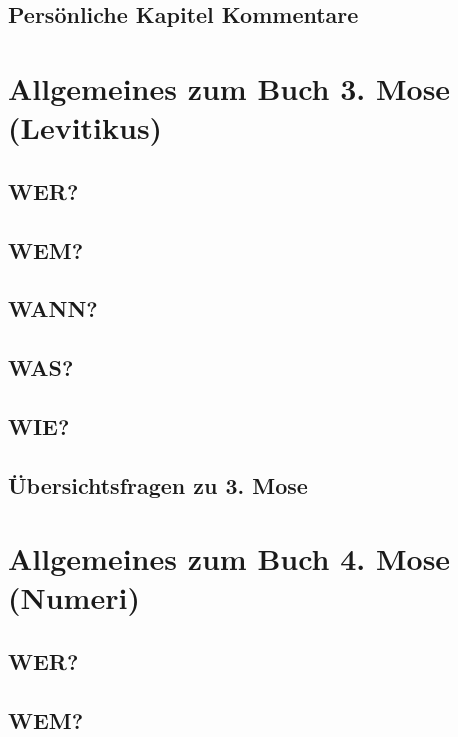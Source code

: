 \subsection{Persönliche Kapitel Kommentare}
    
\section{Allgemeines zum Buch 3. Mose (Levitikus)}
\subsection{WER?}
\subsection{WEM?}
\subsection{WANN?}
\subsection{WAS?}
\subsection{WIE?}
\subsection{Übersichtsfragen zu 3. Mose}
    
\section{Allgemeines zum Buch 4. Mose (Numeri)}
\subsection{WER?}
\subsection{WEM?}
